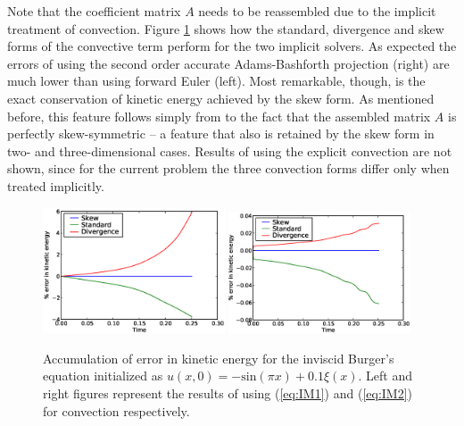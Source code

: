 Note that the coefficient matrix $A$ needs to be reassembled due to the
implicit treatment of convection. Figure \ref{fig:burgers_KE} shows
how the standard, divergence and skew forms of the convective term
perform for the two implicit solvers. As expected the errors of using
the second order accurate Adams-Bashforth projection (right) are much
lower than using forward Euler (left). Most remarkable, though, is the
exact conservation of kinetic energy achieved by the skew form. As
mentioned before, this feature follows simply from to the fact that
the assembled matrix $A$ is perfectly skew-symmetric -- a feature
that also is retained by the skew form in two- and three-dimensional
cases. Results of using the explicit convection are not shown, since
for the current problem the three convection forms differ only when
treated implicitly.

\begin{figure}
 \includegraphics[width=0.48\textwidth]{chapters/mortensen/eps/Burgers_KE_IM1.eps}
 \includegraphics[width=0.48\textwidth]{chapters/mortensen/eps/Burgers_KE_IM2.eps}
 \caption{
Accumulation of error in kinetic energy for the inviscid Burger's equation initialized as $u(x,0)=-\text{sin}(\pi x)+0.1 \xi(x)$. Left and right figures represent the results of using (\ref{eq:IM1}) and (\ref{eq:IM2}) for convection respectively.
}
\label{fig:burgers_KE}
\end{figure}

